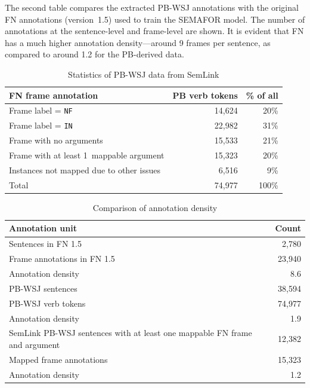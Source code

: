 \documentclass[11pt]{article}
\begin{document}
The second table compares the extracted PB-WSJ annotations with the original FN annotations (version~1.5) used to train the SEMAFOR model. The number of annotations at the sentence-level and frame-level are shown. It is evident that FN has a much higher annotation density---around 9 frames per sentence, as compared to around 1.2 for the PB-derived data.


\begin{table}\centering\small
\begin{tabular}{@{}>{\raggedright}p{13em}@{~~}r@{~~}r@{}}
\bf FN frame annotation & \bf PB verb tokens & \bf \% of all \\ \hline
Frame label = \texttt{NF} & 14,624 & 20\%\\ 
Frame label = \texttt{IN} & 22,982 & 31\% \\ 
Frame with no arguments & 15,533 & 21\% \\ 
Frame with at least 1~mappable argument  & 15,323 & 20\% \\ 
Instances not mapped due to other issues & 6,516 & 9\% \\ \hline 
Total  & 74,977 & 100\% \\
\end{tabular}
\caption{Statistics of PB-WSJ data from SemLink}
\label{tab:wsjstats}
\end{table}

\begin{table}\centering\small
\begin{tabular}{p{17em}r} 
\bf Annotation unit & \bf Count \\\hline 
Sentences in FN 1.5 & 2,780 \\ 
Frame annotations in FN 1.5 & 23,940 \\ %
Annotation density & 8.6 \\ \hline 
PB-WSJ sentences &  38,594 \\ 
PB-WSJ verb tokens & 74,977 \\ 
Annotation density &  1.9 \\\hline
SemLink PB-WSJ sentences with at least one mappable FN frame and argument & 12,382\\ 
Mapped frame annotations & 15,323\\ 
Annotation density & 1.2 \\
\end{tabular}
\caption{Comparison of annotation density}
\label{tab:annoUnit}
\end{table}
\end{document}
